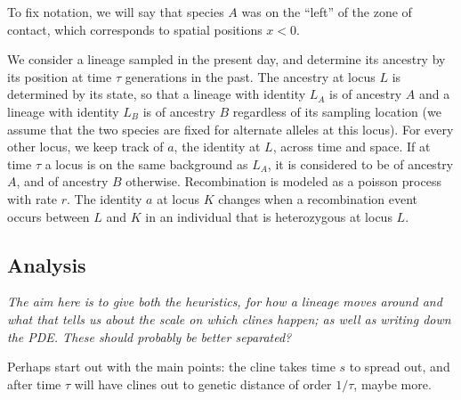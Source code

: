 \documentclass[12pt]{article}
\newcommand{\plr}[1]{{\em \color{blue} #1}}
\begin{document}
To fix notation, we will say that species $A$ was on the ``left'' of the zone of contact,
which corresponds to spatial positions $x<0$.

We consider a lineage sampled in the present day, and determine its ancestry by its position at time $\tau$ generations in the past. The ancestry at locus $L$ is determined by its state, so that a lineage with identity $L_A$ is of ancestry $A$ and a lineage with identity $L_B$ is of ancestry $B$ regardless of its sampling location (we assume that the two species are fixed for alternate alleles at this locus). For every other locus, we keep track of $a$, the identity at $L$, across time and space. If at time $\tau$ a locus is on the same background as $L_A$, it is considered to be of ancestry $A$, and of ancestry $B$ otherwise. Recombination is modeled as a poisson process with rate $r$. The identity $a$ at locus $K$ changes when a recombination event occurs between $L$ and $K$ in an individual that is heterozygous at locus $L$. 




\subsection{Analysis}

\plr{The aim here is to give both the heuristics, for how a lineage moves around
and what that tells us about the scale on which clines happen;
as well as writing down the PDE.  These should probably be better separated?}

Perhaps start out with the main points:
the cline takes time $s$ to spread out,
and after time $\tau$ will have clines out to genetic distance of order $1/\tau$,
maybe more.
\end{document}
